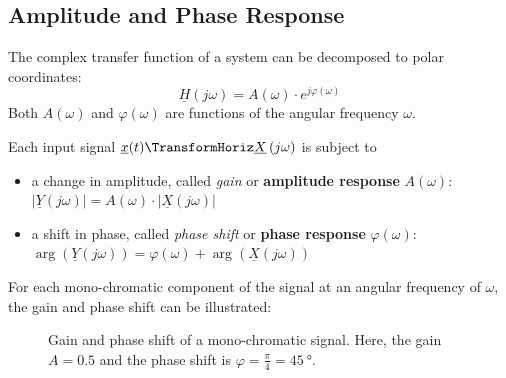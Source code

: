 \begin{refsection}
\subsection{Amplitude and Phase Response}

The complex transfer function of a system can be decomposed to polar coordinates:
\begin{equation}
	\underline{H}\left(j \omega\right) = A(\omega) \cdot e^{j \varphi(\omega)}
\end{equation}
Both $A(\omega)$ and $\varphi(\omega)$ are functions of the angular frequency $\omega$.

Each input signal $\underline{x}(t) \TransformHoriz \underline{X}\left(j \omega\right)$ is subject to
\begin{itemize}
	\item a change in amplitude, called \emph{gain} or  \textbf{amplitude response} $A(\omega)$: $|\underline{Y}\left(j \omega\right)| = A(\omega) \cdot |\underline{X}\left(j \omega\right)|$
	\item a shift in phase, called \emph{phase shift} or  \textbf{phase response} $\varphi(\omega)$: $\arg\left(\underline{Y}\left(j \omega\right)\right) = \varphi(\omega) + \arg\left(\underline{X}\left(j \omega\right)\right)$
\end{itemize}

For each mono-chromatic component of the signal at an angular frequency of $\omega$, the gain and phase shift can be illustrated:
\begin{figure}[H]
	\centering
	\caption[Gain and phase shift of a mono-chromatic signal]{Gain and phase shift of a mono-chromatic signal. Here, the gain $A = 0.5$ and the phase shift is $\varphi = \frac{\pi}{4} = \SI{45}{\degree}$.}
	\label{fig:ch02:gain_phase_shift}
\end{figure}


\end{refsection}
